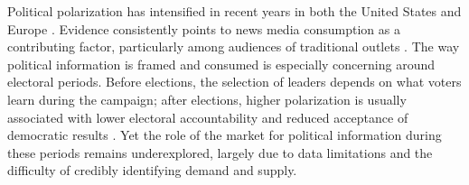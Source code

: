 \documentclass[12pt]{article}
\begin{document}

	Political polarization has intensified in recent years  in both  the United States and Europe \citep{Reiljan2019FearAL}. Evidence consistently points to news media consumption as a contributing factor, particularly among audiences of traditional outlets \citep[][]{martin2017,Boxell2020CrossCountryTI,schneider2025media}. The way political information is framed and consumed is especially concerning around electoral periods. Before elections,  the selection of leaders depends on what voters learn during the campaign; after elections, higher polarization is usually associated with lower electoral accountability and reduced acceptance of democratic results \citep{Besley2005,Graham2019DemocracyIA}. Yet the role of the market for political information during these periods remains underexplored, largely due to data limitations and the difficulty of credibly identifying demand and supply.
	

		
		
		
		
		
\end{document}
